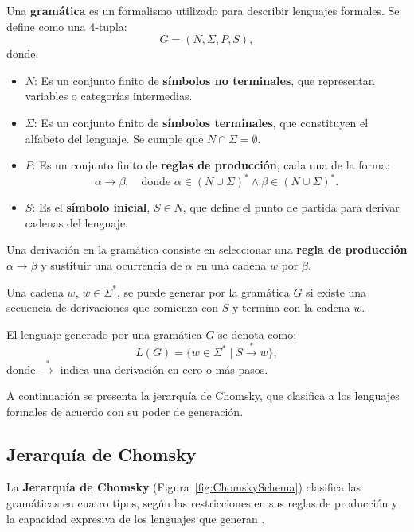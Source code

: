 \documentclass[12pt]{article}
\begin{document}
Una \textbf{gramática} es un formalismo utilizado para describir lenguajes formales. Se define como una 4-tupla:
\[
      G = (N, \Sigma, P, S),
\]
donde:
\begin{itemize}
      \item \(N\): Es un conjunto finito de \textbf{símbolos no terminales}, que representan variables o categorías intermedias.
      \item \(\Sigma\): Es un conjunto finito de \textbf{símbolos terminales}, que constituyen el alfabeto del lenguaje. Se cumple que \(N \cap \Sigma = \emptyset\).
      \item \(P\): Es un conjunto finito de \textbf{reglas de producción}, cada una de la forma:
            \[
                  \alpha \to \beta, \quad \text{donde } \alpha \in (N \cup \Sigma)^* \wedge \beta \in (N \cup \Sigma)^*.
            \]
      \item \(S\): Es el \textbf{símbolo inicial}, \(S \in N\), que define el punto de partida para derivar cadenas del lenguaje.
\end{itemize}

Una derivación en la gramática consiste en seleccionar una \textbf{regla de producción} $\alpha \to \beta$ y sustituir una ocurrencia de 
$\alpha$ en una cadena $w$ por $\beta$.

Una cadena $w$, $w\in\Sigma^*$,  se puede generar por la gramática $G$ si existe una secuencia de derivaciones que comienza con $S$
y termina con la cadena $w$.

El lenguaje generado por una gramática \(G\) se denota como:
\[
      L(G) = \{ w \in \Sigma^* \mid S \overset{*}{\to} w \},
\]
donde \(\overset{*}{\to}\) indica una derivación en cero o más pasos.

A continuación se presenta la jerarquía de Chomsky, que clasifica a los lenguajes formales de acuerdo con su poder de generación.

\subsection{Jerarquía de Chomsky}

La \textbf{Jerarquía de Chomsky} (Figura~\ref{fig:ChomskySchema}) clasifica las gramáticas en cuatro tipos, según las restricciones en sus reglas de producción y la capacidad expresiva de los lenguajes que generan \cite{geeksforgeeks_chomsky_hierarchy}.
\end{document}
